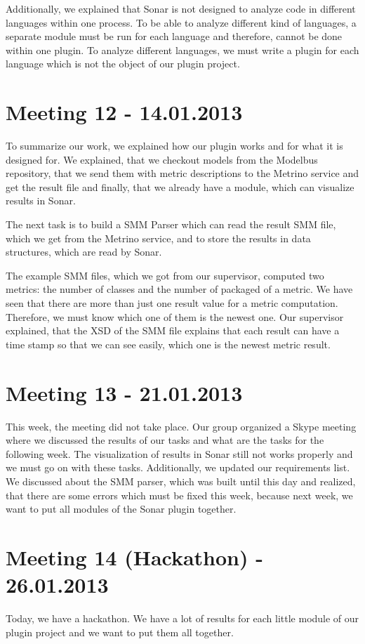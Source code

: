 Additionally, we explained that Sonar is not designed to analyze code in different languages within one process. To be able to analyze different kind of languages, a separate module must be run for each language and therefore, cannot be done within one plugin. To analyze different languages, we must write a plugin for each language which is not the object of our plugin project.

\section{Meeting 12 - 14.01.2013}
To summarize our work, we explained how our plugin works and for what it is designed for. We explained, that we checkout models from the Modelbus repository, that we send them with metric descriptions to the Metrino service and get the result file and finally, that we already have a module, which can visualize results in Sonar.

The next task is to build a SMM Parser which can read the result SMM file, which we get from the Metrino service, and to store the results in data structures, which are read by Sonar.

The example SMM files, which we got from our supervisor, computed two metrics: the number of classes and the number of packaged of a metric. We have seen that there are more than just one result value for a metric computation. Therefore, we must know which one of them is the newest one. Our supervisor explained, that the XSD of the SMM file explains that each result can have a time stamp so that we can see easily, which one is the newest metric result.

\section{Meeting 13 - 21.01.2013}
This week, the meeting did not take place. Our group organized a Skype meeting where we discussed the results of our tasks and what are the tasks for the following week. The visualization of results in Sonar still not works properly and we must go on with these tasks. Additionally, we updated our requirements list. We discussed about the SMM parser, which was built until this day and realized, that there are some errors which must be fixed this week, because next week, we want to put all modules of the Sonar plugin together.

\section{Meeting 14 (Hackathon) - 26.01.2013}
Today, we have a hackathon. We have a lot of results for each little module of our plugin project and we want to put them all together.

